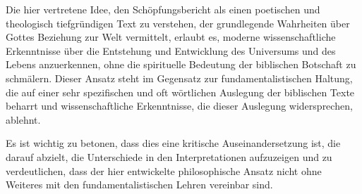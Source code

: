 \documentclass{article}
\begin{document}
Die hier vertretene Idee, den Schöpfungsbericht als einen poetischen und theologisch tiefgründigen Text zu verstehen, der grundlegende Wahrheiten über Gottes Beziehung zur Welt vermittelt, erlaubt es, moderne wissenschaftliche Erkenntnisse über die Entstehung und Entwicklung des Universums und des Lebens anzuerkennen, ohne die spirituelle Bedeutung der biblischen Botschaft zu schmälern. Dieser Ansatz steht im Gegensatz zur fundamentalistischen Haltung, die auf einer sehr spezifischen und oft wörtlichen Auslegung der biblischen Texte beharrt und wissenschaftliche Erkenntnisse, die dieser Auslegung widersprechen, ablehnt.

Es ist wichtig zu betonen, dass dies eine kritische Auseinandersetzung ist, die darauf abzielt, die Unterschiede in den Interpretationen aufzuzeigen und zu verdeutlichen, dass der hier entwickelte philosophische Ansatz nicht ohne Weiteres mit den fundamentalistischen Lehren vereinbar sind.	
\end{document}
